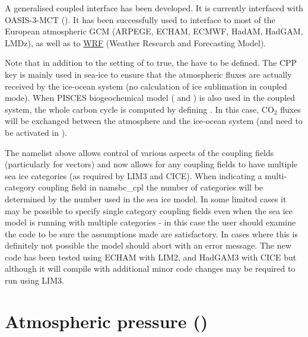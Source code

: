 \documentclass[../main/NEMO_manual]{subfiles}
\begin{document}
A generalised coupled interface has been developed.
It is currently interfaced with OASIS-3-MCT ().
It has been successfully used to interface \NEMO to most of the European atmospheric GCM
(ARPEGE, ECHAM, ECMWF, HadAM, HadGAM, LMDz), as well as to \href{http://wrf-model.org/}{WRF}
(Weather Research and Forecasting Model).

Note that in addition to the setting of  to true, the  have to be defined.
The CPP key is mainly used in sea-ice to ensure that the atmospheric fluxes are actually received by
the ice-ocean system (no calculation of ice sublimation in coupled mode).
When PISCES biogeochemical model ( and ) is also used in the coupled system, 
the whole carbon cycle is computed by defining .
In this case, CO$_2$ fluxes will be exchanged between the atmosphere and the ice-ocean system
(and need to be activated in  ).

The namelist above allows control of various aspects of the coupling fields (particularly for vectors) and
now allows for any coupling fields to have multiple sea ice categories (as required by LIM3 and CICE).
When indicating a multi-category coupling field in namsbc{\_}cpl the number of categories will be determined by
the number used in the sea ice model.
In some limited cases it may be possible to specify single category coupling fields even when
the sea ice model is running with multiple categories -
in this case the user should examine the code to be sure the assumptions made are satisfactory.
In cases where this is definitely not possible the model should abort with an error message.
The new code has been tested using ECHAM with LIM2, and HadGAM3 with CICE but
although it will compile with  additional minor code changes may be required to run using LIM3.


\section{Atmospheric pressure (\protect{})}
\label{sec:SBC_apr}

\end{document}
